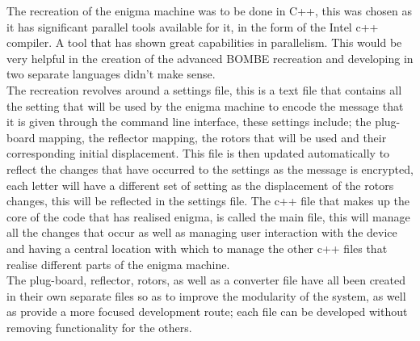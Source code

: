 \documentclass[12pt,a4paper]{article}
\begin{document}
The recreation of the enigma machine was to be done in C++, this was chosen as it has significant parallel tools available for it, in the form of the Intel c++ compiler. A tool that has shown great capabilities in parallelism. This would be very helpful in the creation of the advanced BOMBE recreation and developing in two separate languages didn't make sense.\\

The recreation revolves around a settings file, this is a text file that contains all the setting that will be used by the enigma machine to encode the message that it is given through the command line interface, these settings include; the plug-board mapping, the reflector mapping, the rotors that will be used and their corresponding initial displacement. This file is then updated automatically to reflect the changes that have occurred to the settings as the message is encrypted, each letter will have a different set of setting as the displacement of the rotors changes, this will be reflected in the settings file. The c++ file that makes up the core of the code that has realised enigma, is called the main file, this will manage all the changes that occur as well as managing user interaction with the device and having a central location with which to manage the other c++ files that realise different parts of the enigma machine.\\

The plug-board, reflector, rotors, as well as a converter file have all been created in their own separate files so as to improve the modularity of the system, as well as provide a more focused development route; each file can be developed without removing functionality for the others.\\
\end{document}
